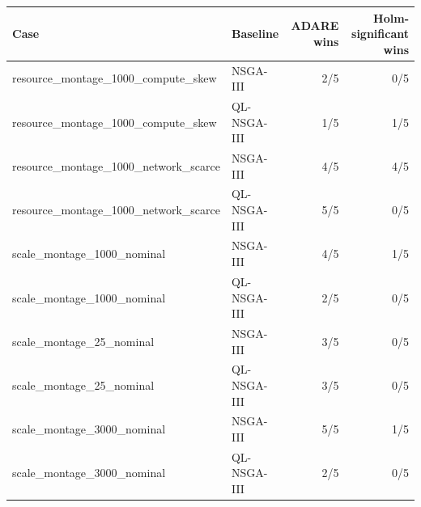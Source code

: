\begin{tabular}{llrr}
\toprule
Case & Baseline & ADARE wins & Holm-significant wins \\
\midrule
resource\_montage\_1000\_compute\_skew & NSGA-III & 2/5 & 0/5 \\
resource\_montage\_1000\_compute\_skew & QL-NSGA-III & 1/5 & 1/5 \\
resource\_montage\_1000\_network\_scarce & NSGA-III & 4/5 & 4/5 \\
resource\_montage\_1000\_network\_scarce & QL-NSGA-III & 5/5 & 0/5 \\
scale\_montage\_1000\_nominal & NSGA-III & 4/5 & 1/5 \\
scale\_montage\_1000\_nominal & QL-NSGA-III & 2/5 & 0/5 \\
scale\_montage\_25\_nominal & NSGA-III & 3/5 & 0/5 \\
scale\_montage\_25\_nominal & QL-NSGA-III & 3/5 & 0/5 \\
scale\_montage\_3000\_nominal & NSGA-III & 5/5 & 1/5 \\
scale\_montage\_3000\_nominal & QL-NSGA-III & 2/5 & 0/5 \\
\bottomrule
\end{tabular}

